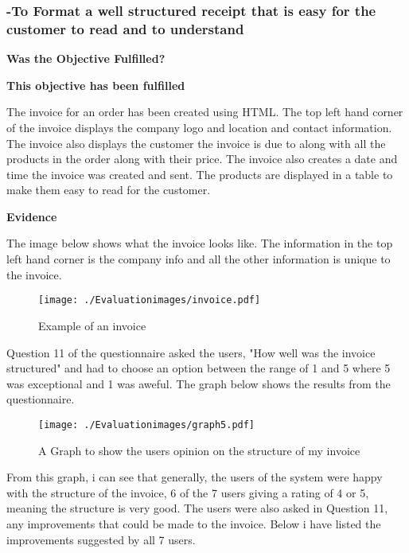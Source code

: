\pagebreak
\subsubsection{-To Format a well structured receipt that is easy for the customer to read and to understand}
\textbf{Was the Objective Fulfilled?} \newline

\textbf{\large{This objective has been fulfilled}}

The invoice for an order has been created using HTML. The top left hand corner of the invoice displays the company logo and location and contact information. The invoice also displays the customer the invoice is due to along with all the products in the order along with their price. The invoice also creates a date and time the invoice was created and sent. The products are displayed in a table to make them easy to read for the customer.

\textbf{Evidence} \newline

The image below shows what the invoice looks like. The information in the top left hand corner is the company info and all the other information is unique to the invoice.

\begin{figure}[H]
\caption{Example of an invoice} \label{invoice}
\hfill\texttt{[image: ./Evaluationimages/invoice.pdf]}
\end{figure}

\pagebreak

Question 11 of the questionnaire asked the users, "How well was the invoice structured" and had to choose an option between the range of 1 and 5 where 5 was exceptional and 1 was aweful. The graph below shows the results from the questionnaire.

 \begin{figure}[H]
\caption{A Graph to show the users opinion on the structure of my invoice} \label{graph5}
\hfill\texttt{[image: ./Evaluationimages/graph5.pdf]}
\end{figure}

From this graph, i can see that generally, the users of the system were happy with the structure of the invoice, 6 of the 7 users giving a rating of 4 or 5, meaning the structure is very good. The users were also asked in Question 11, any improvements that could be made to the invoice. Below i have listed the improvements suggested by all 7 users.

